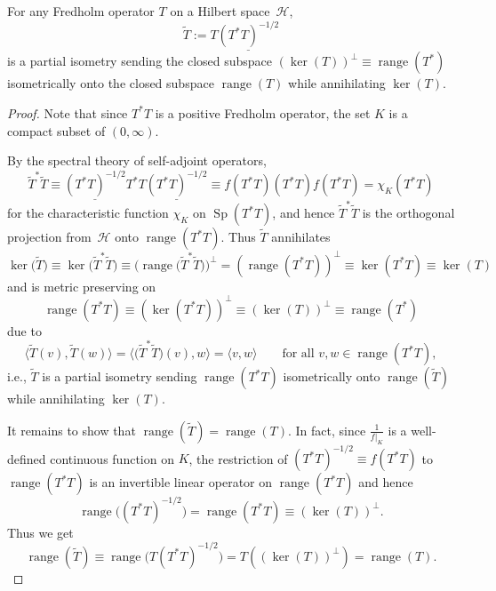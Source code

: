 \begin{lemma}\label{Fredholm} For any Fredholm operator $T$ on a Hilbert space~$\mathcal{H}$,
\[
\tilde{T}:=T\underline{( T^{\ast}T) ^{-1/2}}
\]
is a partial isometry sending the closed subspace $( \ker(T)) ^{\perp}\equiv\operatorname{range}( T^{\ast})
$ isometrically onto the closed subspace $\operatorname{range}(T) $ while annihilating $\ker(T) $.
\end{lemma}
\begin{proof}
Note that since $T^{\ast}T$ is a positive Fredholm operator, the set
$K$ is a compact subset of $ ( 0,\infty) $.

By the spectral theory of self-adjoint operators,
\[
\tilde{T}^{\ast}\tilde{T}\equiv\underline{( T^{\ast}T) ^{-1/2}%
}T^{\ast}T\underline{( T^{\ast}T ) ^{-1/2}}\equiv f (
T^{\ast}T ) ( T^{\ast}T ) f ( T^{\ast}T )
=\chi_{K} ( T^{\ast}T )
\]
for the characteristic function $\chi_{K}$ on $\operatorname{Sp} (
T^{\ast}T ) $, and hence $\tilde{T}^{\ast}\tilde{T}$ is the orthogonal
projection from~$\mathcal{H}$ onto $\operatorname{range} ( T^{\ast}T) $. Thus $\tilde{T}$ annihilates
\[
\ker\big(\tilde{T}\big) \equiv\ker\big( \tilde{T}^{\ast}\tilde
{T}\big) \equiv\big( \operatorname{range}\big( \tilde{T}^{\ast}%
\tilde{T}\big) \big) ^{\perp}= ( \operatorname{range} (
T^{\ast}T ) ) ^{\perp}\equiv\ker ( T^{\ast}T )
\equiv\ker ( T )
\]
and is metric preserving on
\[
\operatorname{range}( T^{\ast}T) \equiv( \ker(
T^{\ast}T) ) ^{\perp}\equiv( \ker(T)
) ^{\perp}\equiv\operatorname{range}( T^{\ast})
\]
due to
\[
\big\langle \tilde{T}(v) ,\tilde{T}(w)
\big\rangle =\big\langle \big( \tilde{T}^{\ast}\tilde{T}\big) (
v) ,w\big\rangle =\langle v,w\rangle \qquad \text{for all }v,w\in\operatorname{range}( T^{\ast}T) ,
\]
i.e., $\tilde{T}$ is a partial isometry sending $\operatorname{range} (
T^{\ast}T ) $ isometrically onto $\operatorname{range} ( \tilde
{T} ) $ while annihilating $\ker ( T ) $.

It remains to show that $\operatorname{range}(\tilde{T})
=\operatorname{range}(T) $. In fact, since $\frac{1}{f|_{K}}$
is a well-defined continuous function on $K$, the restriction of $ (
T^{\ast}T ) ^{-1/2}\equiv f ( T^{\ast}T ) $ to
$\operatorname{range}( T^{\ast}T) $ is an invertible linear
operator on $\operatorname{range} ( T^{\ast}T ) $ and hence
\[
\operatorname{range}\big( ( T^{\ast}T ) ^{-1/2}\big)
=\operatorname{range} ( T^{\ast}T ) \equiv ( \ker (T )) ^{\perp}.
\]
Thus we get
\[
\operatorname{range}(\tilde{T}) \equiv\operatorname{range}
\big( T ( T^{\ast}T ) ^{-1/2}\big) =T ( (
\ker(T) ) ^{\perp} ) =\operatorname{range} (T) .\tag*{\qed}
\]
\renewcommand{\qed}{}
\end{proof}

